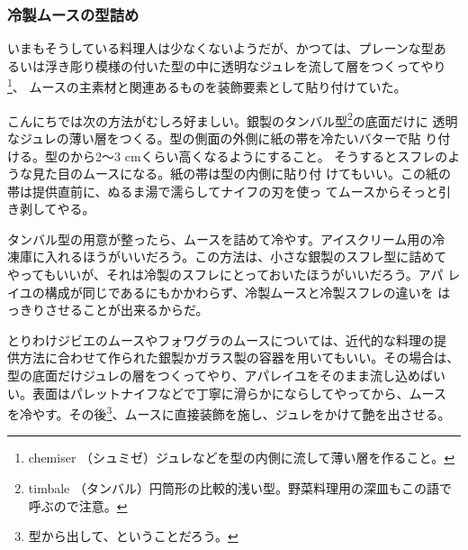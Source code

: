 \begin{recette}
\hypertarget{moulage-des-mousses-froides}{%
\subsubsection{冷製ムースの型詰め}\label{moulage-des-mousses-froides}}



いまもそうしている料理人は少なくないようだが、かつては、プレーンな型あ
るいは浮き彫り模様の付いた型の中に透明なジュレを流して層をつくってやり\footnote{chemiser
  （シュミゼ）ジュレなどを型の内側に流して薄い層を作ること。}、
ムースの主素材と関連あるものを装飾要素として貼り付けていた。

こんにちでは次の方法がむしろ好ましい。銀製のタンバル型\footnote{timbale
  （タンバル）円筒形の比較的浅い型。野菜料理用の深皿もこの語で呼ぶので注意。}の底面だけに
透明なジュレの薄い層をつくる。型の側面の外側に紙の帯を冷たいバターで貼
り付ける。型のから2〜3 cmくらい高くなるようにすること。
そうするとスフレのような見た目のムースになる。紙の帯は型の内側に貼り付
けてもいい。この紙の帯は提供直前に、ぬるま湯で濡らしてナイフの刃を使っ
てムースからそっと引き剥してやる。

タンバル型の用意が整ったら、ムースを詰めて冷やす。アイスクリーム用の冷
凍庫に入れるほうがいいだろう。この方法は、小さな銀製のスフレ型に詰めて
やってもいいが、それは冷製のスフレにとっておいたほうがいいだろう。アパ
レイユの構成が同じであるにもかかわらず、冷製ムースと冷製スフレの違いを
はっきりさせることが出来るからだ。

とりわけジビエのムースやフォワグラのムースについては、近代的な料理の提
供方法に合わせて作られた銀製かガラス製の容器を用いてもいい。その場合は、
型の底面だけジュレの層をつくってやり、アパレイユをそのまま流し込めばい
い。表面はパレットナイフなどで丁寧に滑らかにならしてやってから、ムース
を冷やす。その後\footnote{型から出して、ということだろう。}、ムースに直接装飾を施し、ジュレをかけて艶を出させる。


\end{recette}
